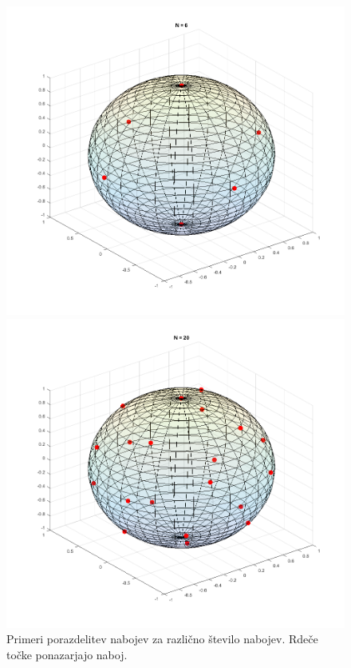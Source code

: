 \documentclass[slovene,11pt,a4paper]{article}
\numberwithin{equation}{section} %
\numberwithin{figure}{section} %
\numberwithin{table}{section} %
\begin{document}
\begin{figure}[t]
{\begin{minipage}[t]{0.5\paperwidth}
\begin{flushleft}

\includegraphics[scale=0.4]{slike/naboj6.png}
\hspace{\fill}
\end{flushleft}
\end{minipage}
\begin{minipage}[t]{0.5\paperwidth}
\includegraphics[scale=0.4]{slike/naboj20.png}
\end{minipage}%
}
\label{slika-naboji1}
\caption{Primeri porazdelitev nabojev za različno število nabojev. Rdeče točke ponazarjajo naboj.}
\end{figure}
\end{document}
